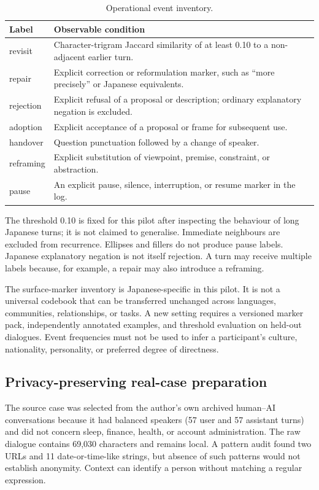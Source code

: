 \documentclass[11pt]{article}
\begin{document}
\begin{table}[t]
\centering
\small
\caption{Operational event inventory.}
\label{tab:events}
\begin{tabular}{p{21mm}p{94mm}}
\toprule
Label & Observable condition \\
\midrule
revisit & Character-trigram Jaccard similarity of at least 0.10 to a non-adjacent earlier turn. \\
repair & Explicit correction or reformulation marker, such as ``more precisely'' or Japanese equivalents. \\
rejection & Explicit refusal of a proposal or description; ordinary explanatory negation is excluded. \\
adoption & Explicit acceptance of a proposal or frame for subsequent use. \\
handover & Question punctuation followed by a change of speaker. \\
reframing & Explicit substitution of viewpoint, premise, constraint, or abstraction. \\
pause & An explicit pause, silence, interruption, or resume marker in the log. \\
\bottomrule
\end{tabular}
\end{table}

The threshold 0.10 is fixed for this pilot after inspecting the behaviour of
long Japanese turns; it is not claimed to generalise. Immediate neighbours are
excluded from recurrence. Ellipses and fillers do not produce pause labels.
Japanese explanatory negation is not itself rejection. A turn may receive
multiple labels because, for example, a repair may also introduce a reframing.

The surface-marker inventory is Japanese-specific in this pilot. It is not a
universal codebook that can be transferred unchanged across languages,
communities, relationships, or tasks. A new setting requires a versioned marker
pack, independently annotated examples, and threshold evaluation on held-out
dialogues. Event frequencies must not be used to infer a participant's culture,
nationality, personality, or preferred degree of directness.

\subsection{Privacy-preserving real-case preparation}

The source case was selected from the author's own archived human--AI
conversations because it had balanced speakers (57 user and 57 assistant turns)
and did not concern sleep, finance, health, or account administration. The raw
dialogue contains 69,030 characters and remains local. A pattern audit found
two URLs and 11 date-or-time-like strings, but absence of such patterns would
not establish anonymity. Context can identify a person without matching a
regular expression.
\end{document}
